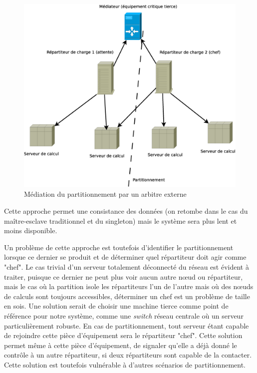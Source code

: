 \begin{figure}
  \includegraphics[width=\linewidth]{Arch_2_part_mediator.eps}
  \caption{Médiation du partitionnement par un arbitre externe}
  \label{fig:arch_2_chef}
\end{figure}

Cette approche permet une consistance des données (on retombe dans le cas du maître-esclave traditionnel
et du singleton) mais le système sera plus lent et moins disponible. 

Un problème de cette approche est toutefois d'identifier le partitionnement lorsque ce dernier se produit et de déterminer quel répartiteur doit agir comme "chef". Le cas trivial d'un 
serveur totalement déconnecté du réseau est évident à traiter, puisque ce dernier ne peut plus voir aucun autre nœud ou répartiteur, mais le cas où la partition isole les répartiteurs 
l'un de l'autre mais où des nœuds de calculs sont toujours accessibles, déterminer un chef est un problème de taille en sois. Une solution serait de choisir une machine tierce comme point de 
référence pour notre système, comme une \emph{switch} réseau centrale où un serveur particulièrement robuste. En cas de partitionnement, tout serveur étant capable de rejoindre cette pièce d'équipement 
sera le répartiteur "chef". Cette solution permet même à cette pièce d'équipement, de signaler qu'elle a déjà donné le contrôle à un autre répartiteur, si deux répartiteurs sont capable de la contacter. 
Cette solution est toutefois vulnérable à d'autres scénarios de partitionnement. 

